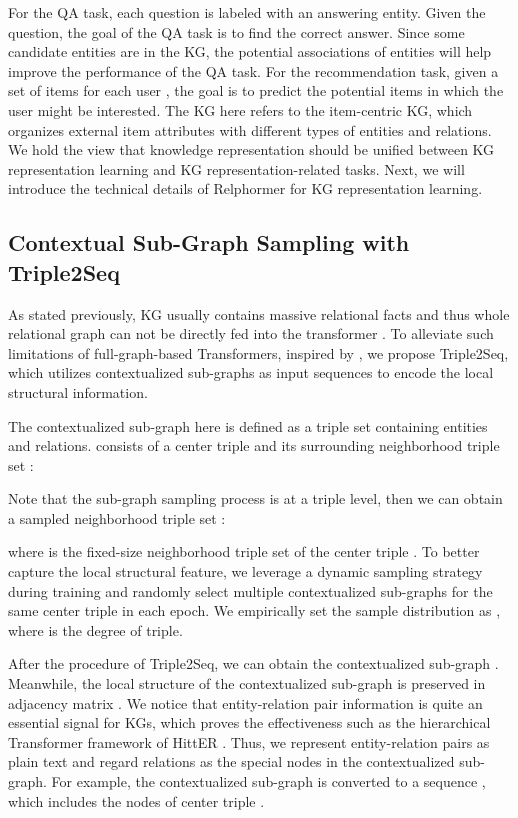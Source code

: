 \documentclass[sigconf]{acmart}
\newcommand{\bizhen}[1]{{\color{black}#1}}
\begin{document}
For the QA task, each question is labeled with an answering entity.
Given the question, the goal of the QA task is to find the correct answer.
Since some candidate entities are in the KG, the potential associations of entities will help improve the performance of the QA task.
For the recommendation task, given a set of items  for each user , the goal is to predict the potential items in which the user might be interested.
The KG here refers to the item-centric KG, which organizes external item attributes with different types of entities and relations.
We hold the view that knowledge representation should be unified between KG representation learning and KG representation-related tasks.
Next, we will introduce the technical details of Relphormer for KG representation learning.


\subsection{Contextual Sub-Graph Sampling with Triple2Seq}
\label{sec:Triple2Seq}

As stated previously, KG usually contains massive relational facts and thus whole relational graph can not be directly fed into the transformer .
To alleviate such limitations of full-graph-based Transformers, inspired by \cite{Gophormer}, we propose Triple2Seq, which utilizes contextualized sub-graphs as input sequences to encode the local structural information.

The contextualized sub-graph   here is defined as a \bizhen{triple set} containing entities and relations.
 consists of a center triple \bizhen{} and its surrounding neighborhood \bizhen{triple} set :




Note that the sub-graph sampling process is at a triple level, then we can obtain a sampled neighborhood \bizhen{triple set} :

\bizhen{
\begin{small}

\end{small}
}


where  is the fixed-size neighborhood triple set of the center triple \bizhen{  }.
To better capture the local structural feature, we leverage \bizhen{a dynamic sampling strategy} during training and randomly select multiple contextualized sub-graphs for the same center triple in each \bizhen{epoch}.
We empirically set the sample distribution as , where  is the degree of triple.

After the procedure of Triple2Seq, we can obtain the contextualized sub-graph .
Meanwhile, the local structure of the contextualized sub-graph is preserved in adjacency matrix .
We notice that entity-relation pair information is quite an essential signal for KGs, which proves the effectiveness such as the hierarchical Transformer framework of HittER \cite{HittER}.
Thus, we represent entity-relation pairs as plain text and regard relations as the special nodes in the contextualized sub-graph.
For example, the contextualized sub-graph is converted to a \bizhen{sequence} , which includes the nodes of center triple \bizhen{}.
\end{document}

